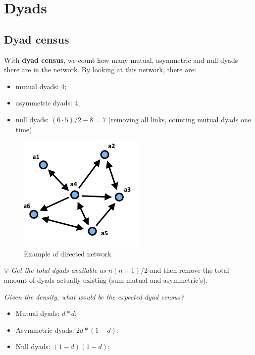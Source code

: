 \documentclass[
  notitlepage,
  onecolumn,
  openany]{book}
\providecommand{\tightlist}{%
  \setlength{\itemsep}{0pt}\setlength{\parskip}{0pt}}
\begin{document}
\hypertarget{dyads}{%
\section{Dyads}\label{dyads}}

\hypertarget{dyad-census}{%
\subsection{Dyad census}\label{dyad-census}}

With \textbf{dyad census}, we count how many mutual, asymmetric and null dyads there are in the network. By looking at this network, there are:

\begin{itemize}
\tightlist
\item
  mutual dyads: \(4\);
\item
  asymmetric dyads: \(4\);
\item
  null dyads: \((6\cdot 5)/2 - 8 = 7\) (removing all links, counting mutual dyads one time).
\end{itemize}

\begin{figure}[h!]

{\centering \includegraphics[width=0.5\linewidth]{images/12-Reciprocity and transitivity/Untitled} 

}

\caption{Example of directed network}\label{fig:unnamed-chunk-99}
\end{figure}

💡 \emph{Get the total dyads available as} \(n(n-1)/2\) and then remove the total amount of dyads actually existing (sum mutual and asymmetric's).

\emph{Given the density, what would be the expected dyad census?}

\begin{itemize}
\tightlist
\item
  Mutual dyads: \(d*d\);
\item
  Asymmetric dyads: \(2d*(1-d)\);
\item
  Null dyads: \((1-d)(1-d)\);
\end{itemize}
\end{document}
